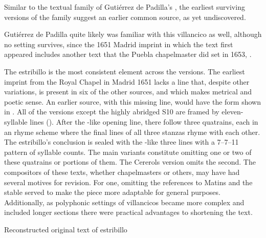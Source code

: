 Similar to the textual family of Gutiérrez de Padilla's , the
earliest surviving versions of the  family suggest an
earlier common source, as yet undiscovered.%
\begin{Footnote}
    Gutiérrez de Padilla quite likely was familiar with this villancico as
    well, although no setting survives, since the 1651 Madrid imprint in which
    the text first appeared includes another text that the Puebla chapelmaster
    did set in 1653, .
\end{Footnote}
The  estribillo is the most consistent element across
the versions.
The earliest imprint from the Royal Chapel in Madrid 1651 lacks a line that,
despite other variations, is present in six of the other sources, and which
makes metrical and poetic sense.
An earlier source, with this missing line, would have the form shown in
.
All of the versions except the highly abridged S10 are framed by eleven-syllable
lines ().
After the -like opening line, there follow three quatrains, each
in an  rhyme scheme where the final lines of all three stanzas rhyme
with each other.
The estribillo's conclusion is sealed with the -like three lines with
a 7--7--11 pattern of syllable counts.
The main variants constitute omitting one or two of these quatrains or portions
of them.
The Cererols version omits the second.
The compositors of these texts, whether chapelmasters or others, may have had
several motives for revision.
For one, omitting the references to Matins  and the stable
served to make the piece more adaptable for general purposes. 
Additionally, as polyphonic settings of villancicos became more complex and
included longer sections there were practical advantages to shortening the
text.

{Reconstructed original text of  estribillo}

